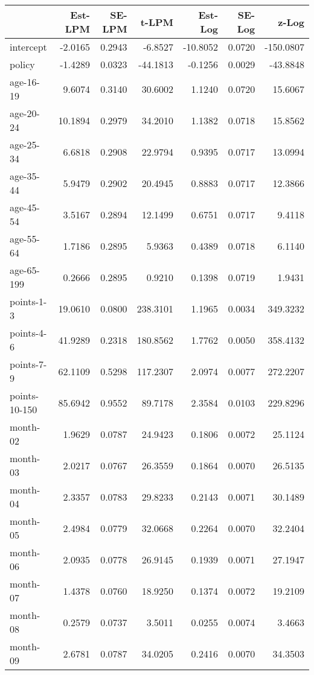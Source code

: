 \documentclass[10pt]{article}
\begin{document}
\begin{table}[ht]
\centering
\begin{tabular}{lrrrrrr}
  \hline
 & Est-LPM & SE-LPM & t-LPM & Est-Log & SE-Log & z-Log \\ 
  \hline
intercept & -2.0165 & 0.2943 & -6.8527 & -10.8052 & 0.0720 & -150.0807 \\ 
  policy & -1.4289 & 0.0323 & -44.1813 & -0.1256 & 0.0029 & -43.8848 \\ 
  age-16-19 & 9.6074 & 0.3140 & 30.6002 & 1.1240 & 0.0720 & 15.6067 \\ 
  age-20-24 & 10.1894 & 0.2979 & 34.2010 & 1.1382 & 0.0718 & 15.8562 \\ 
  age-25-34 & 6.6818 & 0.2908 & 22.9794 & 0.9395 & 0.0717 & 13.0994 \\ 
  age-35-44 & 5.9479 & 0.2902 & 20.4945 & 0.8883 & 0.0717 & 12.3866 \\ 
  age-45-54 & 3.5167 & 0.2894 & 12.1499 & 0.6751 & 0.0717 & 9.4118 \\ 
  age-55-64 & 1.7186 & 0.2895 & 5.9363 & 0.4389 & 0.0718 & 6.1140 \\ 
  age-65-199 & 0.2666 & 0.2895 & 0.9210 & 0.1398 & 0.0719 & 1.9431 \\ 
  points-1-3 & 19.0610 & 0.0800 & 238.3101 & 1.1965 & 0.0034 & 349.3232 \\ 
  points-4-6 & 41.9289 & 0.2318 & 180.8562 & 1.7762 & 0.0050 & 358.4132 \\ 
  points-7-9 & 62.1109 & 0.5298 & 117.2307 & 2.0974 & 0.0077 & 272.2207 \\ 
  points-10-150 & 85.6942 & 0.9552 & 89.7178 & 2.3584 & 0.0103 & 229.8296 \\ 
  month-02 & 1.9629 & 0.0787 & 24.9423 & 0.1806 & 0.0072 & 25.1124 \\ 
  month-03 & 2.0217 & 0.0767 & 26.3559 & 0.1864 & 0.0070 & 26.5135 \\ 
  month-04 & 2.3357 & 0.0783 & 29.8233 & 0.2143 & 0.0071 & 30.1489 \\ 
  month-05 & 2.4984 & 0.0779 & 32.0668 & 0.2264 & 0.0070 & 32.2404 \\ 
  month-06 & 2.0935 & 0.0778 & 26.9145 & 0.1939 & 0.0071 & 27.1947 \\ 
  month-07 & 1.4378 & 0.0760 & 18.9250 & 0.1374 & 0.0072 & 19.2109 \\ 
  month-08 & 0.2579 & 0.0737 & 3.5011 & 0.0255 & 0.0074 & 3.4663 \\ 
  month-09 & 2.6781 & 0.0787 & 34.0205 & 0.2416 & 0.0070 & 34.3503 \\ 

\end{tabular}
\end{table}
\end{document}
